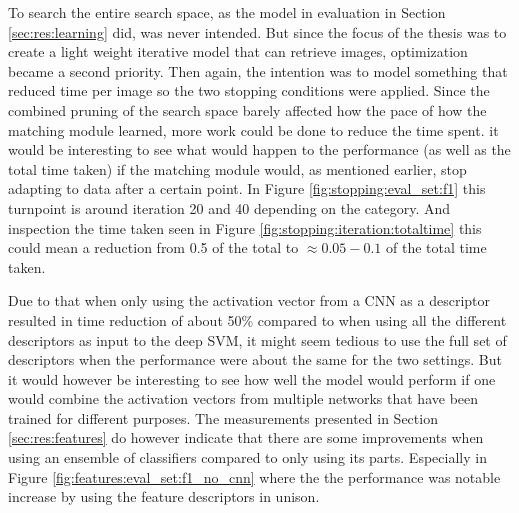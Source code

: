 To search the entire search space, as the model in evaluation in Section \ref{sec:res:learning} did, was never intended. But since the focus of the thesis was to create a light weight iterative model that can retrieve images, optimization became a second priority. Then again, the intention was to model something that reduced time per image so the two stopping conditions were applied. Since the combined pruning of the search space barely affected how the pace of how the matching module learned, more work could be done to reduce the time spent. it would be interesting to see what would happen to the performance (as well as the total time taken) if the matching module would, as mentioned earlier, stop adapting to data after a certain point. In Figure \ref{fig:stopping:eval_set:f1} this turnpoint is around iteration 20 and 40 depending on the category. And inspection the time taken seen in Figure \ref{fig:stopping:iteration:totaltime} this could mean a reduction from 0.5 of the total to $\approx0.05-0.1$ of the total time taken.  


Due to that when only using the activation vector from a CNN as a descriptor resulted in time reduction of about 50\% compared to when using all the different descriptors as input to the deep SVM, it might seem tedious to use the full set of descriptors when the performance were about the same for the two settings. But it would however be interesting to see how well the model would perform if one would combine the activation vectors from multiple networks that have been trained for different purposes. The measurements presented in Section \ref{sec:res:features} do however indicate that there are some improvements when using an ensemble of classifiers compared to only using its parts. Especially in Figure \ref{fig:features:eval_set:f1_no_cnn} where the the performance was notable increase by using the feature descriptors in unison. 


